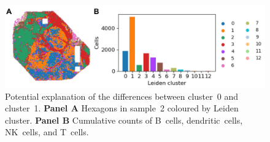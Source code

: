 \documentclass{article}
\begin{document}
\begin{figure}[htbp!]
\centering
\includegraphics[width=.85\linewidth]{./figs/fig_S5_immunehot.png}
\caption{\label{fig:spatial_immunehot}{}Potential explanation of the differences between cluster~0 and cluster~1. \textbf{Panel A} Hexagons in sample~2 coloured by Leiden cluster. \textbf{Panel B} Cumulative counts of B~cells, dendritic~cells, NK~cells, and T~cells.}
\end{figure}
\end{document}
